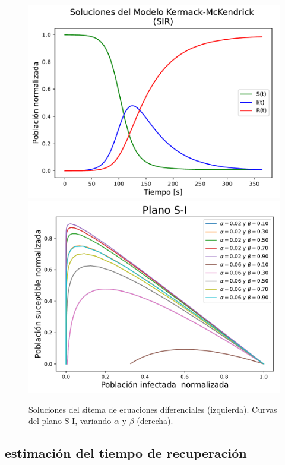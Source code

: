 \documentclass[10pt,oneside]{article}
\theoremstyle{definition}
\begin{document}
\begin{multicols}{2}
      \begin{figure}
          \centering
          \includegraphics[scale=0.5]{Figuras/f1.pdf}\hspace{0.5cm}
          \includegraphics[scale=0.45]{Figuras/f2.pdf}
          \caption{Soluciones del sitema de ecuaciones diferenciales (izquierda). Curvas del plano S-I, variando $\alpha$ y $\beta$ (derecha).}
          \label{fig:1}
      \end{figure}

    \subsection{estimación del tiempo de recuperación}
    

\end{multicols}
\end{document}
